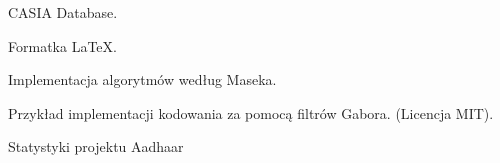 {\begin{enumerate}[{[}A{]}]
	\item \label{web:CASIA} CASIA Database. \\

	\item \label{web:CASIA} Formatka LaTeX. \\

  \item \label{web:masekImplementation} Implementacja algorytmów według Maseka. \\

  \item \label{web:gaborImpl} Przykład implementacji kodowania za pomocą filtrów Gabora. (Licencja MIT). \\

  \item \label{web:aadhaar} Statystyki projektu Aadhaar

\end{enumerate}
}
